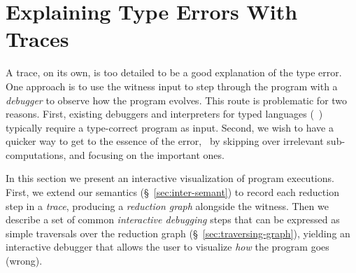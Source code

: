\section{Explaining Type Errors With Traces}
\label{sec:interactive}

A trace, on its own, is too detailed to be
a good explanation of the type error. One approach
is to use the witness input to step through the
program with a \emph{debugger} to observe how
the program evolves.
%
This route is problematic for two reasons.
%
First, existing debuggers and interpreters for
typed languages (\eg\ \ocaml) typically require
a type-correct program as input.
%
Second, we wish to have a quicker way to get
to the essence of the error, \eg\ by skipping
over irrelevant sub-computations, and focusing
on the important ones.

In this section we present an interactive visualization of program
executions.
%
First, we extend our semantics (\S~\ref{sec:inter-semant}) to record
each reduction step in a \emph{trace}, producing a \emph{reduction
  graph} alongside the witness.
%
Then we describe a set of common \emph{interactive debugging} steps that
can be expressed as simple traversals over the reduction graph
(\S~\ref{sec:traversing-graph}), yielding an interactive debugger that
allows the user to visualize \emph{how} the program goes
(wrong).

